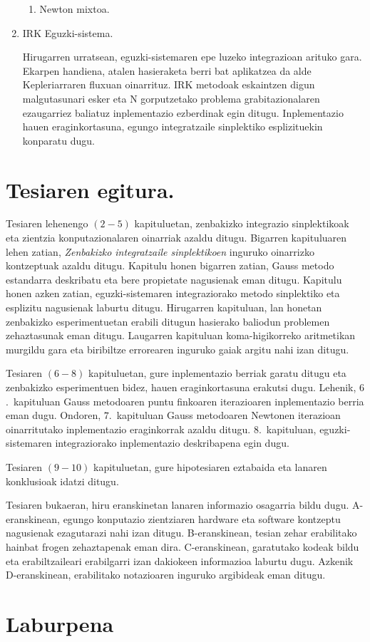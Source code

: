 \begin{enumerate}
\begin{enumerate}
\item Newton mixtoa.


\end{enumerate}
  

\item IRK Eguzki-sistema.

Hirugarren urratsean, eguzki-sistemaren epe luzeko integrazioan arituko gara. Ekarpen handiena, atalen hasieraketa berri bat aplikatzea da alde Kepleriarraren fluxuan oinarrituz. IRK metodoak eskaintzen digun malgutasunari esker eta N gorputzetako problema grabitazionalaren ezaugarriez baliatuz inplementazio ezberdinak egin ditugu. Inplementazio hauen eraginkortasuna, egungo integratzaile sinplektiko esplizituekin konparatu dugu.


\end{enumerate}        


\section{Tesiaren egitura.}

Tesiaren lehenengo $(2-5)$ kapituluetan, zenbakizko integrazio sinplektikoak eta zientzia konputazionalaren oinarriak azaldu ditugu. Bigarren kapituluaren lehen zatian, \emph{Zenbakizko integratzaile sinplektikoen} inguruko oinarrizko kontzeptuak azaldu ditugu. Kapitulu honen bigarren zatian, Gauss metodo estandarra deskribatu eta bere propietate nagusienak eman ditugu. Kapitulu honen azken zatian, eguzki-sistemaren integraziorako metodo sinplektiko eta esplizitu nagusienak laburtu ditugu. Hirugarren kapituluan, lan honetan zenbakizko esperimentuetan erabili ditugun hasierako baliodun problemen zehaztasunak eman ditugu. Laugarren kapituluan koma-higikorreko aritmetikan murgildu gara eta biribiltze errorearen inguruko gaiak argitu nahi izan ditugu.

Tesiaren $(6-8)$ kapituluetan, gure inplementazio berriak garatu ditugu eta zenbakizko esperimentuen bidez, hauen eraginkortasuna erakutsi dugu. Lehenik, $6$.~kapituluan Gauss metodoaren puntu finkoaren iterazioaren inplementazio berria eman dugu. Ondoren, $7$.~kapituluan Gauss metodoaren Newtonen iterazioan oinarritutako inplementazio eraginkorrak azaldu ditugu. $8$.~kapituluan, eguzki-sistemaren integraziorako inplementazio deskribapena egin dugu.  

Tesiaren $(9-10)$ kapituluetan, gure hipotesiaren eztabaida eta lanaren konklusioak idatzi ditugu.

Tesiaren bukaeran, hiru eranskinetan lanaren informazio osagarria bildu dugu. A-eranskinean, egungo konputazio zientziaren hardware eta software kontzeptu nagusienak ezagutarazi nahi izan ditugu. B-eranskinean, tesian zehar erabilitako hainbat frogen zehaztapenak eman dira. C-eranskinean, garatutako kodeak bildu eta erabiltzaileari erabilgarri izan dakiokeen informazioa laburtu dugu. Azkenik D-eranskinean, erabilitako notazioaren inguruko argibideak eman ditugu.

      
      
\section{Laburpena}

